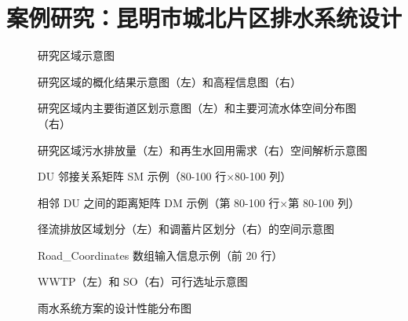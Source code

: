 \documentclass[degree=doctor]{sysuthesis}
\begin{document}
\chapter{案例研究：昆明市城北片区排水系统设计}

\clearpage
\setcounter{page}{109}
\begin{figure}
  \centering
  \caption{研究区域示意图}
\end{figure}

\clearpage
\setcounter{page}{111}
\begin{figure}
  \centering
  \caption{研究区域的概化结果示意图（左）和高程信息图（右）}
\end{figure}

\clearpage
\setcounter{page}{113}
\begin{figure}
  \centering
  \caption{研究区域内主要街道区划示意图（左）和主要河流水体空间分布图（右）}
\end{figure}

\clearpage
\setcounter{page}{116}
\begin{figure}
  \centering
  \caption{研究区域污水排放量（左）和再生水回用需求（右）空间解析示意图}
\end{figure}

\begin{figure}
  \centering
  \caption{DU 邻接关系矩阵 SM 示例（80-100 行×80-100 列）}
\end{figure}

\clearpage
\setcounter{page}{117}
\begin{figure}
  \centering
  \caption{相邻 DU 之间的距离矩阵 DM 示例（第 80-100 行×第 80-100 列）}
\end{figure}

\begin{figure}
  \centering
  \caption{径流排放区域划分（左）和调蓄片区划分（右）的空间示意图}
\end{figure}

\clearpage
\setcounter{page}{118}
\begin{figure}
  \centering
  \caption{Road\_Coordinates 数组输入信息示例（前 20 行）}
\end{figure}

\begin{figure}
  \centering
  \caption{WWTP（左）和 SO（右）可行选址示意图}
\end{figure}

\clearpage
\setcounter{page}{121}
\begin{figure}
  \centering
  \caption{雨水系统方案的设计性能分布图}
\end{figure}
\end{document}
